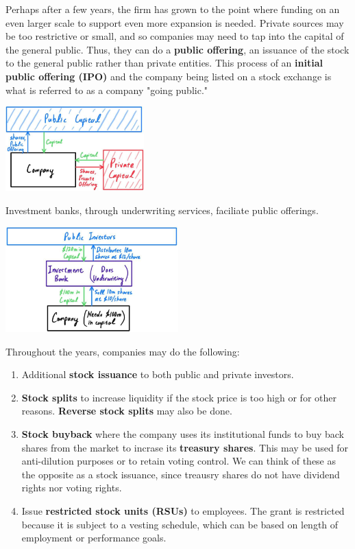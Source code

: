 \documentclass{article}
\begin{document}
    Perhaps after a few years, the firm has grown to the point where funding on an even larger scale to support even more expansion is needed. Private sources may be too restrictive or small, and so companies may need to tap into the capital of the general public. Thus, they can do a \textbf{public offering}, an issuance of the stock to the general public rather than private entities. This process of an \textbf{initial public offering (IPO)} and the company being listed on a stock exchange is what is referred to as a company "going public." 
    \begin{center}
      \includegraphics[width=0.4\textwidth]{img/Going_public.jpg}
    \end{center}
    Investment banks, through underwriting services, faciliate public offerings. 
    \begin{center}
      \includegraphics[width=0.5\textwidth]{img/Investment_bank_underwriting.jpg}
    \end{center}
    Throughout the years, companies may do the following: 
    \begin{enumerate}
      \item Additional \textbf{stock issuance} to both public and private investors. 
      \item \textbf{Stock splits} to increase liquidity if the stock price is too high or for other reasons. \textbf{Reverse stock splits} may also be done. 
      \item \textbf{Stock buyback} where the company uses its institutional funds to buy back shares from the market to incrase its \textbf{treasury shares}. This may be used for anti-dilution purposes or to retain voting control. We can think of these as the opposite as a stock issuance, since treausry shares do not have dividend rights nor voting rights. 
      \item Issue \textbf{restricted stock units (RSUs)} to employees. The grant is restricted because it is subject to a vesting schedule, which can be based on length of employment or performance goals. 
    \end{enumerate}
\end{document}
